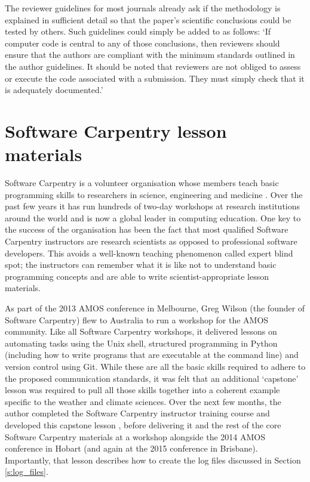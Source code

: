 The reviewer guidelines for most journals already ask if the methodology is explained in sufficient detail so that the paper's scientific conclusions could be tested by others. Such guidelines could simply be added to as follows: `If computer code is central to any of those conclusions, then reviewers should ensure that the authors are compliant with the minimum standards outlined in the author guidelines. It should be noted that reviewers are not obliged to assess or execute the code associated with a submission. They must simply check that it is adequately documented.'   



\section{Software Carpentry lesson materials}\label{s:reproducibility_lessons}

Software Carpentry is a volunteer organisation whose members teach basic programming skills to researchers in science, engineering and medicine \citep{Wilson2014}. Over the past few years it has run hundreds of two-day workshops at research institutions around the world and is now a global leader in computing education. One key to the success of the organisation has been the fact that most qualified Software Carpentry instructors are research scientists as opposed to professional software developers. This avoids a well-known teaching phenomenon called expert blind spot; the instructors can remember what it is like not to understand basic programming concepts and are able to write scientist-appropriate lesson materials.

As part of the 2013 AMOS conference in Melbourne, Greg Wilson (the founder of Software Carpentry) flew to Australia to run a workshop for the AMOS community. Like all Software Carpentry workshops, it delivered lessons on automating tasks using the Unix shell, structured programming in Python (including how to write programs that are executable at the command line) and version control using Git. While these are all the basic skills required to adhere to the proposed communication standards, it was felt that an additional `capstone' lesson was required to pull all those skills together into a coherent example specific to the weather and climate sciences. Over the next few months, the author completed the Software Carpentry instructor training course and developed this capstone lesson \citep{IrvingSWC2015}, before delivering it and the rest of the core Software Carpentry materials at a workshop alongside the 2014 AMOS conference in Hobart (and again at the 2015 conference in Brisbane). Importantly, that lesson describes how to create the log files discussed in Section \ref{s:log_files}. 


